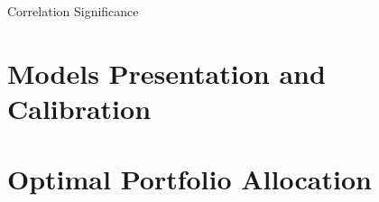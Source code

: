 \documentclass[c, 10pt]{beamer}
\begin{document}
\begin{frame}{Correlation Significance}


\end{frame}




\section{Models Presentation and Calibration}



\section{Optimal Portfolio Allocation}


%    
%    			
%    			
%    			
%    			
%    			
\end{document}
